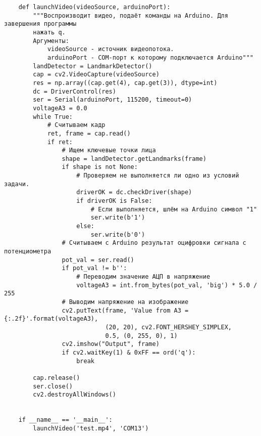 \begin{verbatim}
    def launchVideo(videoSource, arduinoPort):
        """Воспроизводит видео, подаёт команды на Arduino. Для завершения программы
        нажать q.
        Аргументы:
            videoSource - источник видеопотока.
            arduinoPort - COM-порт к которому подключается Arduino"""
        landDetector = LandmarkDetector()
        cap = cv2.VideoCapture(videoSource)
        res = np.array((cap.get(4), cap.get(3)), dtype=int)
        dc = DriverControl(res)
        ser = Serial(arduinoPort, 115200, timeout=0)
        voltageA3 = 0.0
        while True:
            # Считываем кадр
            ret, frame = cap.read()
            if ret:
                # Ищем ключевые точки лица
                shape = landDetector.getLandmarks(frame)
                if shape is not None:
                    # Проверяем не выполняется ли одно из условий задачи.
                    driverOK = dc.checkDriver(shape)
                    if driverOK is False:
                        # Если выполняется, шлём на Arduino символ "1"
                        ser.write(b'1')
                    else:
                        ser.write(b'0')
                # Считываем с Arduino результат оцифровки сигнала с потенциометра
                pot_val = ser.read()
                if pot_val != b'':
                    # Переводим значение АЦП в напряжение
                    voltageA3 = int.from_bytes(pot_val, 'big') * 5.0 / 255
                # Выводим напряжение на изображение
                cv2.putText(frame, 'Value from A3 = {:.2f}'.format(voltageA3),
                            (20, 20), cv2.FONT_HERSHEY_SIMPLEX,
                            0.5, (0, 255, 0), 1)
                cv2.imshow("Output", frame)
                if cv2.waitKey(1) & 0xFF == ord('q'):
                    break

        cap.release()
        ser.close()
        cv2.destroyAllWindows()


    if __name__ == '__main__':
        launchVideo('test.mp4', 'COM13')

\end{verbatim}